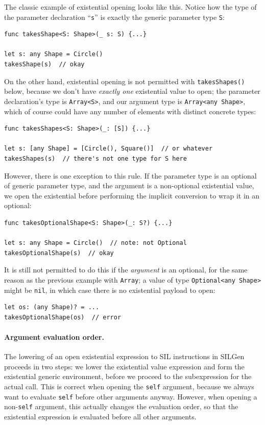 \documentclass[../generics]{subfiles}
\begin{document}
\begin{example}
The classic example of existential opening looks like this. Notice how the type of the parameter declaration ``\texttt{s}'' is exactly the generic parameter type \texttt{S}:
\begin{Verbatim}
func takesShape<S: Shape>(_ s: S) {...}

let s: any Shape = Circle()
takesShape(s)  // okay
\end{Verbatim}
On the other hand, existential opening is not permitted with \texttt{takesShapes()} below, because we don't have \emph{exactly one} existential value to open; the parameter declaration's type is \texttt{Array<S>}, and our argument type is \texttt{Array<any Shape>}, which of course could have any number of elements with distinct concrete types:
\begin{Verbatim}
func takesShapes<S: Shape>(_: [S]) {...}

let s: [any Shape] = [Circle(), Square()]  // or whatever
takesShapes(s)  // there's not one type for S here
\end{Verbatim}
However, there is one exception to this rule. If the parameter type is an optional of generic parameter type, and the argument is a non-optional existential value, we open the existential before performing the implicit conversion to wrap it in an optional:
\begin{Verbatim}
func takesOptionalShape<S: Shape>(_: S?) {...}

let s: any Shape = Circle()  // note: not Optional
takesOptionalShape(s)  // okay
\end{Verbatim}
It is still not permitted to do this if the \emph{argument} is an optional, for the same reason as the previous example with \texttt{Array}; a value of type \verb|Optional<any Shape>| might be \texttt{nil}, in which case there is no existential payload to open:
\begin{Verbatim}
let os: (any Shape)? = ...
takesOptionalShape(os)  // error
\end{Verbatim}
\end{example}

\paragraph{Argument evaluation order.}
The lowering of an open existential expression to SIL instructions in SILGen proceeds in two steps: we lower the existential value expression and form the existential generic environment, before we proceed to the subexpression for the actual call. This is correct when opening the \texttt{self} argument, because we always want to evaluate \texttt{self} before other arguments anyway. However, when opening a non-\texttt{self} argument, this actually changes the evaluation order, so that the existential expression is evaluated before all other arguments.
\end{document}
